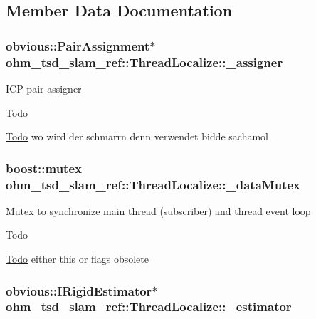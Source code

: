 \subsection{Member Data Documentation}
\hypertarget{classohm__tsd__slam__ref_1_1ThreadLocalize_a45c7b109a3a9f22e0c60111c58eb0dd3}{
\subsubsection[{\-\_\-assigner}]{\setlength{\rightskip}{0pt plus 5cm}obvious\-::\-Pair\-Assignment$\ast$ ohm\-\_\-tsd\-\_\-slam\-\_\-ref\-::\-Thread\-Localize\-::\-\_\-assigner\hspace{0.3cm}{\ttfamily [private]}}}\label{classohm__tsd__slam__ref_1_1ThreadLocalize_a45c7b109a3a9f22e0c60111c58eb0dd3}
I\-C\-P pair assigner \begin{DoxyRefDesc}{Todo}
\item[\hyperlink{todo__todo000021}{Todo}]wo wird der schmarrn denn verwendet bidde sachamol \end{DoxyRefDesc}
\hypertarget{classohm__tsd__slam__ref_1_1ThreadLocalize_ad1b612e37ab54ffe1958cac7d5f9c89c}{
\subsubsection[{\-\_\-data\-Mutex}]{\setlength{\rightskip}{0pt plus 5cm}boost\-::mutex ohm\-\_\-tsd\-\_\-slam\-\_\-ref\-::\-Thread\-Localize\-::\-\_\-data\-Mutex\hspace{0.3cm}{\ttfamily [private]}}}\label{classohm__tsd__slam__ref_1_1ThreadLocalize_ad1b612e37ab54ffe1958cac7d5f9c89c}
Mutex to synchronize main thread (subscriber) and thread event loop \begin{DoxyRefDesc}{Todo}
\item[\hyperlink{todo__todo000019}{Todo}]either this or flags obsolete \end{DoxyRefDesc}
\hypertarget{classohm__tsd__slam__ref_1_1ThreadLocalize_a34dc7fcb1cc798542270309014f09b93}{
\subsubsection[{\-\_\-estimator}]{\setlength{\rightskip}{0pt plus 5cm}obvious\-::\-I\-Rigid\-Estimator$\ast$ ohm\-\_\-tsd\-\_\-slam\-\_\-ref\-::\-Thread\-Localize\-::\-\_\-estimator\hspace{0.3cm}{\ttfamily [private]}}}\label{classohm__tsd__slam__ref_1_1ThreadLocalize_a34dc7fcb1cc798542270309014f09b93}
